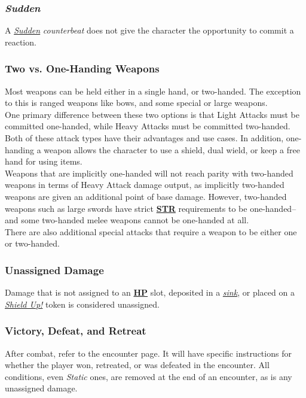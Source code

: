 \documentclass[12pt]{article}
\newcommand{\refto}[1]{\hyperlink{#1}{\textbf{#1}}}
\newcommand{\reftoit}[1]{\hyperlink{#1}{\emph{#1}}}
\begin{document}
\begin{multicols*}{2}
\subsubsection{\emph{Sudden}}
\hypertarget{Sudden}{}
A \reftoit{Sudden} \emph{counterbeat} does not give the character the opportunity to commit a reaction.

\subsubsection{Two vs. One-Handing Weapons}
Most weapons can be held either in a single hand, or two-handed. The exception to this is ranged weapons like bows, and some special or large weapons.\\
One primary difference between these two options is that Light Attacks must be committed one-handed, while Heavy Attacks must be committed two-handed. Both of these attack types have their advantages and use cases. In addition, one-handing a weapon allows the character to use a shield, dual wield, or keep a free hand for using items.\\
Weapons that are implicitly one-handed will not reach parity with two-handed weapons in terms of Heavy Attack damage output, as implicitly two-handed weapons are given an additional point of base damage. However, two-handed weapons such as large swords have strict \refto{STR} requirements to be one-handed--and some two-handed melee weapons cannot be one-handed at all.\\
There are also additional special attacks that require a weapon to be either one or two-handed.

\subsubsection{Unassigned Damage}
Damage that is not assigned to an \refto{HP} slot, deposited in a \reftoit{sink}, or placed on a \reftoit{Shield Up!} token is considered unassigned.

\subsubsection{Victory, Defeat, and Retreat}
After combat, refer to the encounter page. It will have specific instructions for whether the player won, retreated, or was defeated in the encounter. All conditions, even \emph{Static} ones, are removed at the end of an encounter, as is any unassigned damage.\\


\end{multicols*}
\end{document}
